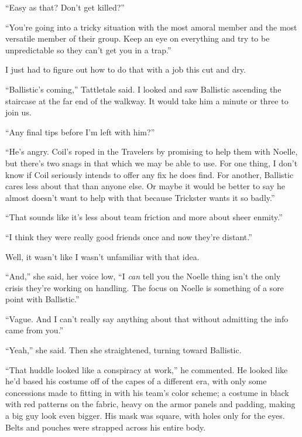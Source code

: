 ``Easy as that?  Don't get killed?''



``You're going into a tricky situation with the most amoral member and the most versatile member of their group.  Keep an eye on everything and try to be unpredictable so they can't get you in a trap.''



I just had to figure out how to do that with a job this cut and dry.



``Ballistic's coming,'' Tattletale said.  I looked and saw Ballistic ascending the staircase at the far end of the walkway.  It would take him a minute or three to join us.



``Any final tips before I'm left with him?''



``He's angry.  Coil's roped in the Travelers by promising to help them with Noelle, but there's two snags in that which we may be able to use.  For one thing, I don't know if Coil seriously intends to offer any fix he does find.  For another, Ballistic cares less about that than anyone else.  Or maybe it would be better to say he almost doesn't want to help with that because Trickster wants it so badly.''



``That sounds like it's less about team friction and more about sheer enmity.''



``I think they were really good friends once and now they're distant.''



Well, it wasn't like I wasn't unfamiliar with that idea.



``And,'' she said, her voice low, ``I \emph{can} tell you the Noelle thing isn't the only crisis they're working on handling.  The focus on Noelle is something of a sore point with Ballistic.''



``Vague.  And I can't really say anything about that without admitting the info came from you.''



``Yeah,'' she said.  Then she straightened, turning toward Ballistic.



``That huddle looked like a conspiracy at work,'' he commented.  He looked like he'd based his costume off of the capes of a different era, with only some concessions made to fitting in with his team's color scheme; a costume in black with red patterns on the fabric, heavy on the armor panels and padding, making a big guy look even bigger.  His mask was square, with holes only for the eyes.  Belts and pouches were strapped across his entire body.



